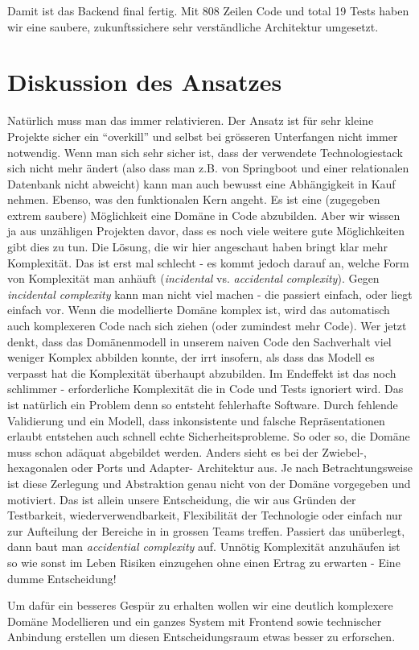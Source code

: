 Damit ist das Backend final fertig. Mit 808 Zeilen Code und total 19 
Tests haben wir eine saubere, zukunftssichere sehr verständliche 
Architektur umgesetzt.

\section{Diskussion des Ansatzes}
Natürlich muss man das immer relativieren. Der Ansatz ist für sehr kleine
Projekte sicher ein ``overkill'' und selbst bei grösseren Unterfangen nicht
immer notwendig. Wenn man sich sehr sicher ist, dass der verwendete
Technologiestack sich nicht mehr ändert (also dass man z.B. von 
Springboot und einer relationalen Datenbank nicht abweicht) kann man auch
bewusst eine Abhängigkeit in Kauf nehmen. Ebenso, was den funktionalen Kern
angeht. Es ist eine (zugegeben extrem saubere) Möglichkeit eine 
Domäne in Code abzubilden. Aber wir wissen ja aus unzähligen Projekten davor,
dass es noch viele weitere gute Möglichkeiten gibt dies zu tun. 
Die Lösung, die wir hier angeschaut haben bringt klar mehr Komplexität. Das ist
erst mal schlecht - es kommt jedoch darauf an, welche Form von Komplexität man 
anhäuft (\textit{incidental} vs. \textit{accidental} \textit{complexity}).
Gegen \textit{incidental complexity} kann man nicht viel machen - die passiert
einfach, oder liegt einfach vor. Wenn die modellierte Domäne komplex ist, wird
das automatisch auch komplexeren Code nach sich ziehen (oder zumindest mehr 
Code). Wer jetzt denkt, dass
das Domänenmodell in unserem naiven Code den Sachverhalt viel weniger Komplex 
abbilden konnte, der irrt insofern, als dass das Modell es verpasst hat die 
Komplexität überhaupt abzubilden. Im Endeffekt ist das noch schlimmer - 
erforderliche Komplexität die in Code und Tests ignoriert wird. Das ist 
natürlich ein Problem denn so entsteht fehlerhafte Software. Durch fehlende
Validierung und ein Modell, dass inkonsistente und falsche Repräsentationen
erlaubt entstehen auch schnell echte Sicherheitsprobleme. So oder so, die
Domäne muss schon adäquat abgebildet werden.
Anders sieht es bei der Zwiebel-, hexagonalen oder Ports und Adapter- 
Architektur aus. Je nach Betrachtungsweise ist diese Zerlegung und Abstraktion
genau nicht von der Domäne vorgegeben und motiviert. Das ist allein unsere
Entscheidung, die wir aus Gründen der Testbarkeit, wiederverwendbarkeit, 
Flexibilität der Technologie oder einfach nur zur Aufteilung der Bereiche in
in grossen Teams treffen. Passiert das unüberlegt, dann baut man 
\textit{accidential complexity} auf. Unnötig Komplexität anzuhäufen ist so wie
sonst im Leben Risiken einzugehen ohne einen Ertrag zu erwarten - Eine
dumme Entscheidung!

Um dafür ein besseres Gespür zu erhalten wollen wir eine deutlich
komplexere Domäne Modellieren und ein ganzes System mit Frontend sowie 
technischer Anbindung erstellen um diesen Entscheidungsraum etwas besser 
zu erforschen.
